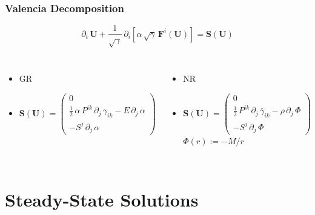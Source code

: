 \documentclass{beamer}
\newcommand{\p}{\partial}
\newcommand{\bs}{\boldsymbol}
\begin{document}
\begin{frame}
\frametitle{Valencia Decomposition}

  \begin{equation*}
    \p_{t}\,\bs{U}
    +\frac{1}{\sqrt{\gamma}}\,
    \p_{i}\left[\alpha\,\sqrt{\gamma}\,\bs{F}^{i}\left(\bs{U}\right)\right]
    =\bs{S}\left(\bs{U}\right)
  \end{equation*}

\Fontvi

  \begin{columns}[c]


      \begin{itemize}
        \item[]
          GR
        \item[]
          $\bs{S}\left(\bs{U}\right)=
          \begin{pmatrix}
          0 \\[1em]
          \frac{1}{2}\,\alpha\,P^{ik}\,\p_{j}\,\gamma_{ik}
            -E\,\p_{j}\,\alpha \\[1em]
          -S^{j}\,\p_{j}\,\alpha
          \end{pmatrix}$
      \end{itemize}


      \begin{itemize}
        \item[]
          NR
        \item[]
          $\bs{S}\left(\bs{U}\right)=
          \begin{pmatrix}
          0 \\[1em]
          \frac{1}{2}\,P^{ik}\,\p_{j}\,\bar{\gamma}_{ik}
            -\rho\,\p_{j}\,\Phi \\[1em]
          -S^{j}\,\p_{j}\,\Phi
          \end{pmatrix}$
          $\Phi\left(r\right):=-M/r$
      \end{itemize}

  \end{columns}

\end{frame}

\section{Steady-State Solutions}
\end{document}
